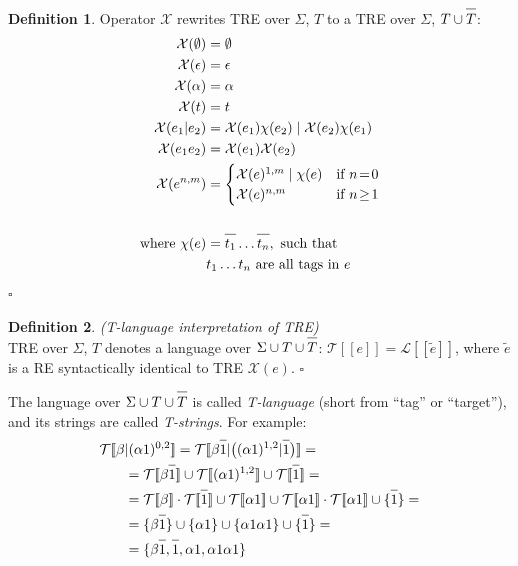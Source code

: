 \documentclass{article}
\newcommand{\Xeq}{\!=\!}
\newcommand{\Xlb}{[\![}
\newcommand{\Xrb}{]\!]}
\newcommand{\XL}{\mathcal{L}}
\newcommand{\XT}{\mathcal{T}}
\newcommand{\XX}{\mathcal{X}}
\newcommand*{\Xbar}[1]{\overline{#1\vphantom{\bar{#1}}}}
\theoremstyle{definition}
\newtheorem{Xdef}{Definition}
\begin{document}
\begin{multicols}{2}
    \begin{Xdef}\label{deftlang}
    Operator $\XX$ rewrites TRE over $\Sigma$, $T$ to a TRE over $\Sigma$, $T \cup \Xbar{T}$:
    \begin{align*}
        \XX(\emptyset) &= \emptyset \\
        \XX(\epsilon) &= \epsilon \\
        \XX(\alpha) &= \alpha \\
        \XX(t) &= t \\
        \XX(e_1 | e_2)
            &=      \XX(e_1) \chi(e_2) \mid \XX(e_2) \chi(e_1) \\
        \XX(e_1 e_2) &= \XX(e_1) \XX(e_2) \\
        \XX(e^{n,m}) &= \begin{cases}
                \XX(e)^{1,m} \mid \chi(e) &\text{if } n \Xeq 0 \\
                \XX(e)^{n,m} &\text{if } n \!\geq\! 1
            \end{cases} \\
        \\
        \text{where }
            \chi(e) &= \Xbar{t_1} \dots \Xbar{t_n}, \text{ such that} \\
                &t_1 \dots t_n \text{ are all tags in } e
    \end{align*}
    $\square$
    \end{Xdef}

    \begin{Xdef}\label{deftlang}
    \emph{(T-language interpretation of TRE)} \\
    TRE over $\Sigma$, $T$ denotes a language over $\Sigma \cup T \cup \Xbar{T}$:
    $\XT \Xlb e \Xrb = \XL \Xlb \widetilde{e} \Xrb$, where $\widetilde{e}$ is a RE
    syntactically identical to TRE $\XX(e)$.
    $\square$
    \end{Xdef}

The language over $\Sigma \cup T \cup \Xbar{T}$ is called \emph{T-language}
(short from ``tag'' or ``target''), and its strings are called \emph{T-strings}.
For example:
\begin{align*}
    \XT \Xlb \beta &| (\alpha 1)^{0,2} \Xrb
=
    \XT \Xlb \beta \Xbar{1} | \big( (\alpha 1)^{1,2} | \Xbar{1} \big) \Xrb = \\
&=
    \XT \Xlb \beta \Xbar{1} \Xrb
        \cup \XT \Xlb (\alpha 1)^{1,2} \Xrb
        \cup \XT \Xlb \Xbar{1} \Xrb = \\
&=
    \XT \Xlb \beta \Xrb
        \cdot \XT \Xlb \Xbar{1} \Xrb \cup
    \XT \Xlb \alpha 1 \Xrb
            \cup \XT \Xlb \alpha 1 \Xrb \cdot \XT \Xlb \alpha 1 \Xrb
        \cup \{\Xbar{1}\} = \\
&=
    \{\beta \Xbar{1}\} \cup
    \{\alpha 1 \} \cup
    \{\alpha 1 \alpha 1 \} \cup
    \{\Xbar{1}\} = \\
&=
    \{\beta \Xbar{1}, \Xbar{1}, \alpha 1, \alpha 1 \alpha 1 \}
\end{align*}


\end{multicols}
\end{document}

